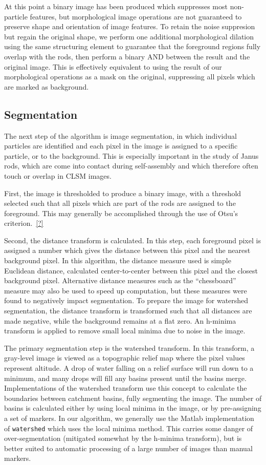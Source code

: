 At this point a binary image has been produced which suppresses most non-particle features, but morphological
image operations are not guaranteed to preserve shape and orientation of image features.  To retain the noise suppresion
but regain the original shape, we perform one additional morphological dilation using the same structuring element to
guarantee that the foreground regions fully overlap with the rods, then perform a binary AND between the result and the
original image. This is effectively equivalent to using the result of our morphological operations as a mask on
the original, suppressing
all pixels which are marked as background.

\subsection{Segmentation}

The next step of the algorithm is image segmentation, in which individual particles are identified and each pixel
in the image is assigned to a specific particle, or to the background. This is especially important in the study 
of Janus rods, which are come into contact during self-assembly and which therefore often touch or overlap in 
CLSM images. 

First, the image is thresholded to produce a binary image, with a threshold selected such that all pixels which
are part of the rods are assigned to the foreground. This may generally be accomplished through the use of 
Otsu's criterion.~\ref{?}

Second, the distance transform is calculated.  In this step, each foreground pixel is assigned a number which
gives the distance between this pixel and the nearest background pixel. In this algorithm, the distance measure used
is simple Euclidean distance, calculated center-to-center between this pixel and the closest background pixel.  Alternative
distance measures such as the ``chessboard'' measure may also be used to speed up computation, but these measures were
found to negatively impact segmentation.  To prepare the image for watershed segmentation, the distance 
transform is transformed such that all distances are made
negative, while the background remains at a flat zero. An h-minima transform is applied to remove small local minima
due to noise in the image.

The primary segmentation step is the watershed transform. In this transform, a gray-level image is viewed as
a topographic relief map where the pixel values represent altitude. A drop of water falling on a relief 
surface will run down to a minimum, and many drops will fill any basins present until the basins merge.
Implementations of the watershed transform use this concept to calculate the boundaries between catchment basins,
fully segmenting the image.  The number of basins is calculated either by using local minima in the image, or by 
pre-assigning a set of markers.  In our algorithm, we generally use the Matlab implementation of \texttt{watershed} which
uses the local minima method.  This carries some danger of over-segmentation (mitigated somewhat by the 
h-minima transform), but is better suited to automatic processing of a large number of images than manual markers.

